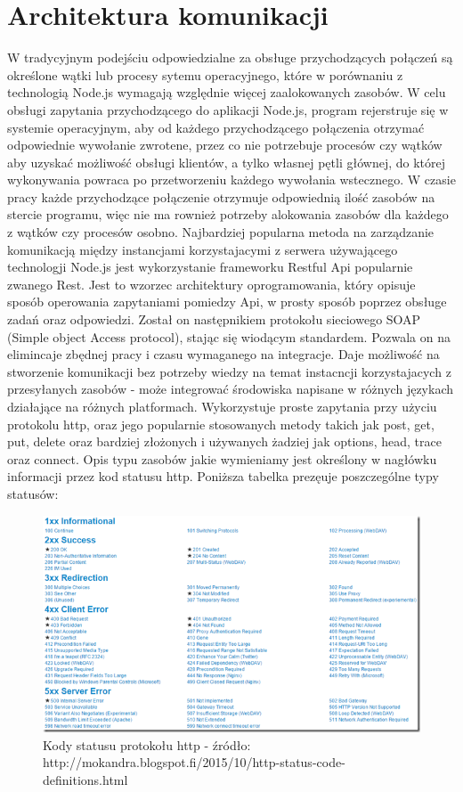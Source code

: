 \documentclass[12pt]{report}
\begin{document}
\section{Architektura komunikacji}
W tradycyjnym podejściu odpowiedzialne za obsługe przychodzących połączeń są określone wątki lub procesy sytemu operacyjnego, które w porównaniu z technologią Node.js wymagają względnie więcej zaalokowanych zasobów. 
W celu obsługi zapytania przychodzącego do aplikacji Node.js, program rejerstruje się w systemie operacyjnym, aby od każdego przychodzącego połączenia otrzymać odpowiednie wywołanie zwrotene, przez co nie potrzebuje procesów czy wątków aby uzyskać możliwość obsługi klientów, a tylko własnej pętli głównej, do której wykonywania powraca po przetworzeniu każdego wywołania wstecznego. 
W czasie pracy każde przychodzące połączenie otrzymuje odpowiednią ilość zasobów na stercie programu, więc nie ma rownież potrzeby alokowania zasobów dla każdego z wątków czy procesów osobno. 
Najbardziej popularna metoda na zarządzanie komunikacją między instancjami korzystajacymi z serwera używającego technologji Node.js jest wykorzystanie frameworku Restful Api popularnie zwanego Rest. 
Jest to wzorzec architektury oprogramowania, który opisuje sposób operowania zapytaniami pomiedzy Api, w prosty sposób poprzez obsługe zadań oraz odpowiedzi. 
Został on następnikiem protokołu sieciowego SOAP (Simple object Access protocol), stając się wiodącym standardem. 
Pozwala on na elimincaje zbędnej pracy i czasu wymaganego na integracje. 
Daje możliwość na stworzenie komunikacji bez potrzeby wiedzy na temat instacncji korzystajacych z przesyłanych zasobów - może integrować środowiska napisane w różnych językach działające na różnych platformach. 
Wykorzystuje proste zapytania przy użyciu protokolu http, oraz jego popularnie stosowanych metody takich jak post, get, put, delete oraz bardziej złożonych i używanych żadziej jak options, head, trace oraz connect. 
Opis typu zasobów jakie wymieniamy jest określony w nagłówku informacji przez kod statusu http. 
Poniższa tabelka prezęuje poszczególne typy statusów:

\begin{figure}[!hb]
\centering
\includegraphics[width=\textwidth,height=\textheight,keepaspectratio]{statuses.png} 
\caption{Kody statusu protokołu http - źródło: http://mokandra.blogspot.fi/2015/10/http-status-code-definitions.html}
\end{figure}
\end{document}

